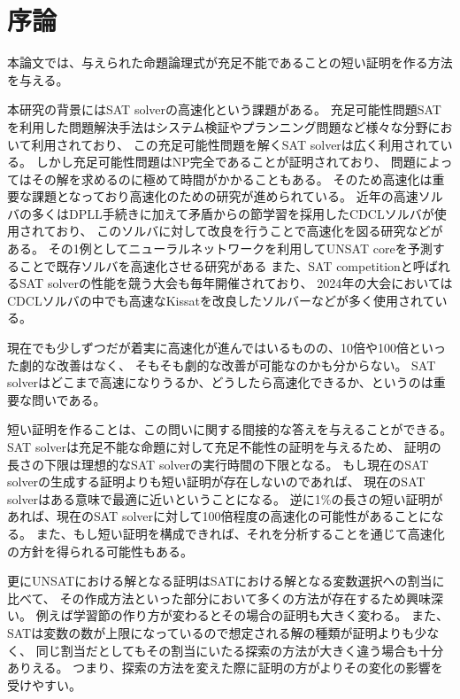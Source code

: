 \section{序論}

本論文では、与えられた命題論理式が充足不能であることの短い証明を作る方法を与える。\cite{Kamo00}

本研究の背景にはSAT solverの高速化という課題がある。
充足可能性問題SATを利用した問題解決手法はシステム検証やプランニング問題など様々な分野において利用されており、
この充足可能性問題を解くSAT solverは広く利用されている。
しかし充足可能性問題はNP完全であることが証明されており、
問題によってはその解を求めるのに極めて時間がかかることもある。
そのため高速化は重要な課題となっており高速化のための研究が進められている。
近年の高速ソルバの多くはDPLL手続きに加えて矛盾からの節学習を採用したCDCLソルバが使用されており、
このソルバに対して改良を行うことで高速化を図る研究などがある。
その1例としてニューラルネットワークを利用してUNSAT coreを予測することで既存ソルバを高速化させる研究がある
また、SAT competitionと呼ばれるSAT solverの性能を競う大会も毎年開催されており、
2024年の大会においてはCDCLソルバの中でも高速なKissatを改良したソルバーなどが多く使用されている。%

現在でも少しずつだが着実に高速化が進んではいるものの、10倍や100倍といった劇的な改善はなく、
そもそも劇的な改善が可能なのかも分からない。
SAT solverはどこまで高速になりうるか、どうしたら高速化できるか、というのは重要な問いである。

短い証明を作ることは、この問いに関する間接的な答えを与えることができる。
SAT solverは充足不能な命題に対して充足不能性の証明を与えるため、
証明の長さの下限は理想的なSAT solverの実行時間の下限となる。 
もし現在のSAT solverの生成する証明よりも短い証明が存在しないのであれば、
現在のSAT solverはある意味で最適に近いということになる。
逆に1\%の長さの短い証明があれば、現在のSAT solverに対して100倍程度の高速化の可能性があることになる。
また、もし短い証明を構成できれば、それを分析することを通じて高速化の方針を得られる可能性もある。

更にUNSATにおける解となる証明はSATにおける解となる変数選択への割当に比べて、
その作成方法といった部分において多くの方法が存在するため興味深い。
例えば学習節の作り方が変わるとその場合の証明も大きく変わる。
また、SATは変数の数が上限になっているので想定される解の種類が証明よりも少なく、
同じ割当だとしてもその割当にいたる探索の方法が大きく違う場合も十分ありえる。
つまり、探索の方法を変えた際に証明の方がよりその変化の影響を受けやすい。

